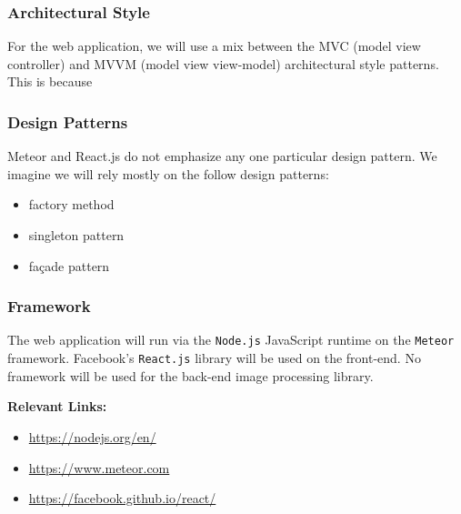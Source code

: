 \subsubsection{Architectural Style}
  For the web application, we will use a mix between the MVC (model view
  controller) and MVVM (model view view-model) architectural style patterns.
  This is because

\subsubsection{Design Patterns}
  Meteor and React.js do not emphasize any one particular design pattern. We
  imagine we will rely mostly on the follow design patterns:
  \begin{itemize}
    \item factory method
    \item singleton pattern
    \item fa\c{c}ade pattern
  \end{itemize}

\subsubsection{Framework}
  The web application will run via the \texttt{Node.js} JavaScript runtime on
  the \texttt{Meteor} framework. Facebook's \texttt{React.js} library will be
  used on the front-end. No framework will be used for the back-end image
  processing library.

  \textbf{Relevant Links:}
  \begin{itemize}
    \item \url{https://nodejs.org/en/}
    \item \url{https://www.meteor.com}
    \item \url{https://facebook.github.io/react/}
  \end{itemize}
